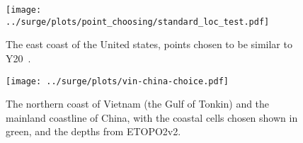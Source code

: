 \begin{figure}[htb!]
\centering
\texttt{[image: ../surge/plots/point\_choosing/standard\_loc\_test.pdf]}

\vspace{-5pt}

\caption{The east coast of the United states, points chosen to be similar to
Y20~\cite{ZannaPreprint}.}
\label{fig:america}


\texttt{[image: ../surge/plots/vin-china-choice.pdf]}

\vspace{-9pt}

\caption{The northern coast of Vietnam (the Gulf of Tonkin)
and the mainland coastline of China, with the coastal cells chosen shown in green,
and the depths from ETOPO2v2.}
\label{fig:vin-china}
\end{figure}
